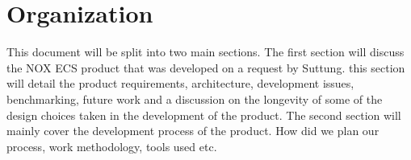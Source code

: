 \section{Organization}
This document will be split into two main sections.
The first section will discuss the NOX ECS product that was developed
on a request by Suttung.
this section will detail the product requirements, architecture,
development issues, benchmarking, future work and a discussion on the longevity
of some of the design choices taken in the development of the product.
The second section will mainly cover the development process of the product.
How did we plan our process, work methodology, tools used etc.
